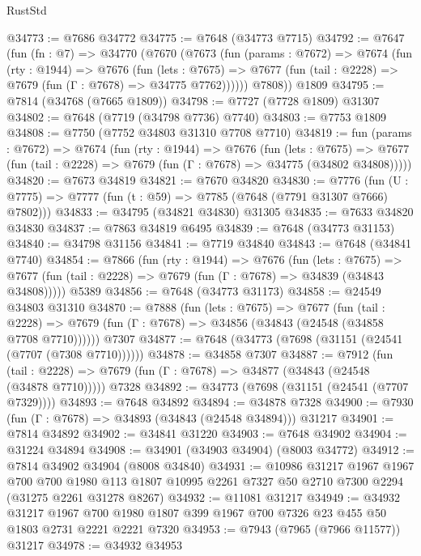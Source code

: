 \begin{lexlean}{RustStd}
\begin{coremodule}
{\begin{coremodule}
{{{{{{{{{{{{{{{{{{{{{{{{{{{{{{{{{{{{{{{{{{{{{{{{{{{{{@34773 := @7686 @34772
@34775 := @7648 (@34773 @7715)
@34792 := @7647
    (fun (fn : @7) =>
    @34770
      (@7670
        (@7673
          (fun (params : @7672) =>
          @7674
            (fun (rty : @1944) =>
            @7676
              (fun (lets : @7675) =>
              @7677 (fun (tail : @2228) => @7679 (fun (Γ : @7678) => @34775 @7762))))))
        @7808))
    @1809
@34795 := @7814 (@34768 (@7665 @1809))
@34798 := @7727 (@7728 @1809) @31307
@34802 := @7648 (@7719 (@34798 @7736) @7740)
@34803 := @7753 @1809
@34808 := @7750 (@7752 @34803 @31310 @7708 @7710)
@34819 := fun (params : @7672) =>
  @7674
    (fun (rty : @1944) =>
    @7676
      (fun (lets : @7675) =>
      @7677 (fun (tail : @2228) => @7679 (fun (Γ : @7678) => @34775 (@34802 @34808)))))
@34820 := @7673 @34819
@34821 := @7670 @34820
@34830 := @7776
    (fun (U : @7775) => @7777 (fun (t : @59) => @7785 (@7648 (@7791 @31307 @7666) @7802)))
@34833 := @34795 (@34821 @34830) @31305
@34835 := @7633 @34820 @34830
@34837 := @7863 @34819 @6495
@34839 := @7648 (@34773 @31153)
@34840 := @34798 @31156
@34841 := @7719 @34840
@34843 := @7648 (@34841 @7740)
@34854 := @7866
    (fun (rty : @1944) =>
    @7676
      (fun (lets : @7675) =>
      @7677 (fun (tail : @2228) => @7679 (fun (Γ : @7678) => @34839 (@34843 @34808)))))
    @5389
@34856 := @7648 (@34773 @31173)
@34858 := @24549 @34803 @31310
@34870 := @7888
    (fun (lets : @7675) =>
    @7677
      (fun (tail : @2228) =>
      @7679 (fun (Γ : @7678) => @34856 (@34843 (@24548 (@34858 @7708 @7710))))))
    @7307
@34877 := @7648 (@34773 (@7698 (@31151 (@24541 (@7707 (@7308 @7710))))))
@34878 := @34858 @7307
@34887 := @7912
    (fun (tail : @2228) => @7679 (fun (Γ : @7678) => @34877 (@34843 (@24548 (@34878 @7710)))))
    @7328
@34892 := @34773 (@7698 (@31151 (@24541 (@7707 @7329))))
@34893 := @7648 @34892
@34894 := @34878 @7328
@34900 := @7930 (fun (Γ : @7678) => @34893 (@34843 (@24548 @34894))) @31217
@34901 := @7814 @34892
@34902 := @34841 @31220
@34903 := @7648 @34902
@34904 := @31224 @34894
@34908 := @34901 (@34903 @34904) (@8003 @34772)
@34912 := @7814 @34902 @34904 (@8008 @34840)
@34931 := @10986
    @31217
    @1967
    @1967
    @700
    @700
    @1980
    @113
    @1807
    @10995
    @2261
    @7327
    @50
    @2710
    @7300
    @2294
    (@31275 @2261 @31278 @8267)
@34932 := @11081 @31217
@34949 := @34932
    @31217
    @1967
    @700
    @1980
    @1807
    @399
    @1967
    @700
    @7326
    @23
    @455
    @50
    @1803
    @2731
    @2221
    @2221
    @7320
@34953 := @7943 (@7965 (@7966 @11577)) @31217
@34978 := @34932
    @34953
}}}}}}}}}}}}}}}}}}}}}}}}}}}}}}}}}}}}}}}}}}}}}}}}}}}}}
\end{coremodule}}
\end{coremodule}
\end{lexlean}
